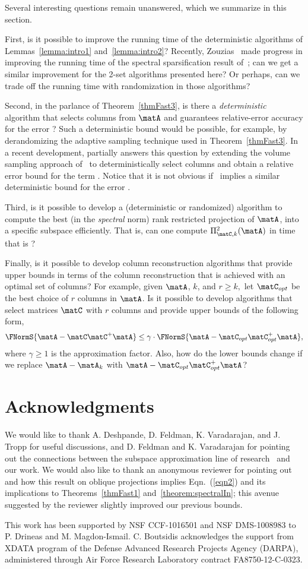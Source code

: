 Several interesting questions remain unanswered, which we summarize in this section.

First, is it possible to improve the running time of the deterministic algorithms of Lemmas~\ref{lemma:intro1} and~\ref{lemma:intro2}? Recently, Zouzias~\cite{Zouzias} made progress in improving the running time of the spectral sparsification result of~\cite{BSS09}; can we get a similar improvement for the 2-set algorithms presented here? Or perhaps, can we trade off the running time with randomization in those algorithms?

Second, in the parlance of Theorem~\ref{thmFast3}, is there a \textit{deterministic} algorithm that selects  columns from $\matA$ and guarantees relative-error accuracy for the error ? Such a deterministic bound would be possible, for example, by derandomizing the adaptive sampling technique used in Theorem~\ref{thmFast3}. In a recent development, \cite{GS2011} partially answers this question by extending the volume sampling approach of~\cite{DR10} to deterministically select
 columns
and obtain a relative error bound for the term \math{\FNormS{ \matA - \matC\matC^+\matA}}. Notice that
it is not obvious if~\cite{GS2011} implies a similar deterministic bound for the error
.

Third, is it possible to develop a (deterministic or randomized) algorithm to compute the best (in the \emph{spectral} norm) rank restricted 
projection of $\matA$, into a specific subspace
\math{\matC} efficiently. That is, can one
compute
$ \Pi_{\matC,k}^{\mathrm{2}}(\matA)$ in 
time that is ?

Finally, is it possible to develop column reconstruction algorithms that provide upper bounds in terms of the column reconstruction that is achieved with an optimal set of columns?
For example, given $\matA$, $k$, and $r \ge k,$ let $\matC_{opt}$ be the best choice of $r$ columns in $\matA$. Is it possible to develop algorithms that
select matrices $\matC$ with $r$ columns and provide upper bounds of the following form,
$$\FNormS{ \matA - \matC\matC^+\matA} \le \gamma \cdot \FNormS{ \matA - \matC_{opt}\matC_{opt}^+\matA}, $$
where $\gamma \ge 1$ is the approximation factor. Also, how do the lower bounds change if we replace $\matA-\matA_k$ with $ \matA - \matC_{opt}\matC_{opt}^+\matA$?

\section*{Acknowledgments}
We would like to thank A. Deshpande, D. Feldman, K. Varadarajan, and J. Tropp for useful discussions, and D. Feldman and K. Varadarajan for pointing out the connections between the subspace approximation line of research~\cite{DV07,FL11, FMSW10,SV07} and our work. We would also like to thank an anonymous reviewer for 
pointing out \cite{Szy06} and how this result on oblique projections
implies Eqn.~(\ref{eqn2}) and its implications to Theorems~\ref{thmFast1} 
and~\ref{theorem:spectralIn}; this avenue 
suggested by the reviewer slightly improved our previous bounds.

This work has been supported by NSF CCF-1016501 and NSF DMS-1008983 to P. Drineas and M. Magdon-Ismail. C. Boutsidis acknowledges the support from XDATA program of the Defense Advanced Research Projects Agency (DARPA), administered through Air Force Research Laboratory contract FA8750-12-C-0323.

